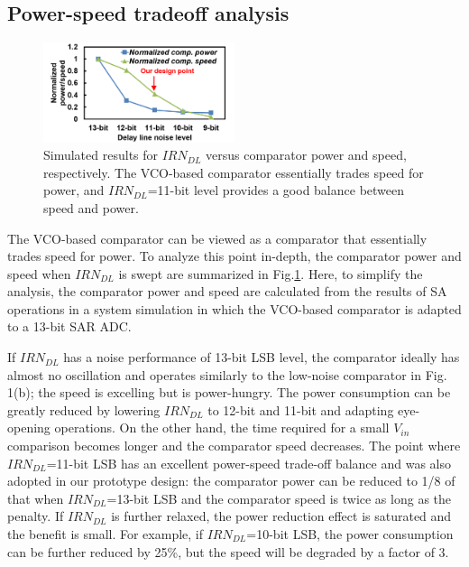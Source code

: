 \documentclass[journal]{IEEEtran}
\begin{document}
\subsection{Power-speed tradeoff analysis}
\begin{figure}[!]
\centering
 \includegraphics[width=0.5\textwidth]{figs/comp_anal.png}
  \caption{Simulated results for $IRN_{DL}$ versus comparator power and speed, respectively. The VCO-based comparator essentially trades speed for power, and $IRN_{DL}$=11-bit level provides a good balance between speed and power.}
  \label{comp-anal}
\end{figure}
The VCO-based comparator can be viewed as a comparator that essentially trades speed for power.
To analyze this point in-depth, the comparator power and speed when $IRN_{DL}$ is swept are summarized in Fig.\ref{comp-anal}.
Here, to simplify the analysis, the comparator power and speed are calculated from the results of SA operations in a system simulation in which the VCO-based comparator is adapted to a 13-bit SAR ADC.

If $IRN_{DL}$ has a noise performance of 13-bit LSB level, the comparator ideally has almost no oscillation and operates similarly to the low-noise comparator in Fig. 1(b); the speed is excelling but is power-hungry. The power consumption can be greatly reduced by lowering $IRN_{DL}$ to 12-bit and 11-bit and adapting eye-opening operations. On the other hand, the time required for a small $V_{in}$ comparison becomes longer and the comparator speed decreases. The point where $IRN_{DL}$=11-bit LSB has an excellent power-speed trade-off balance and was also adopted in our prototype design: the comparator power can be reduced to 1/8 of that when $IRN_{DL}$=13-bit LSB and the comparator speed is twice as long as the penalty. If $IRN_{DL}$ is further relaxed, the power reduction effect is saturated and the benefit is small. For example, if $IRN_{DL}$=10-bit LSB, the power consumption can be further reduced by 25\%, but the speed will be degraded by a factor of 3.
\end{document}
